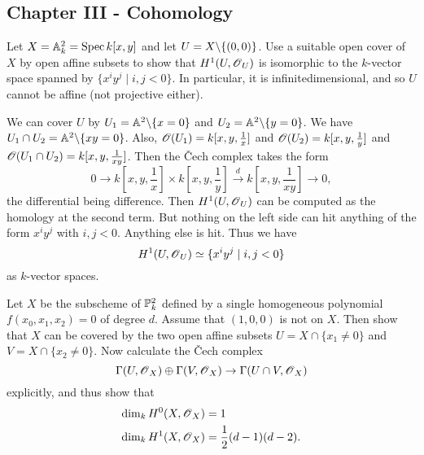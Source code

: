\documentclass[11pt, english]{article}
\begin{document}
\subsection{Chapter III - Cohomology}

\begin{exc}[Exercise 4.3]
Let $X= \mathbb{A}^2_k=\operatorname{Spec} k[x,y]$ and let $U = X \backslash \{(0,0)\}$. Use a suitable open cover of $X$ by open affine subsets to show that $H^1(U,\operatorname{\mathscr{O}}_U)$ is isomorphic to the $k$-vector space spanned by $\{ x^i y^j \mid i,j < 0 \}$. In particular, it is infinitedimensional, and so $U$ cannot be affine (not projective either).  
\end{exc}
\begin{sol}
We can cover $U$ by $U_1= \mathbb{A}^2 \backslash \{ x= 0\}$ and $U_2 = \mathbb{A}^2 \backslash \{ y = 0\}$. We have $U_1 \cap U_2 = \mathbb{A}^2 \backslash \{ xy=0\}$. Also, $\operatorname{\mathscr{O}}(U_1)=k[x,y,\frac 1x]$ and $\operatorname{\mathscr{O}}(U_2)=k[x,y,\frac 1y]$ and $\operatorname{\mathscr{O}}(U_1 \cap U_2) = k[x,y,\frac {1}{xy}]$. Then the \v{C}ech complex takes the form
\[
0 \to k[x,y,\frac 1x] \times k[x,y, \frac 1y] \xrightarrow{d} k[x,y,\frac{1}{xy}] \to 0,
\]
the differential being difference. Then $H^1(U,\operatorname{\mathscr{O}}_U)$ can be computed as the homology at the second term. But nothing on the left side can hit anything of the form $x^iy^j$ with $i,j < 0$. Anything else is hit. Thus we have
\[
H^1(U, \operatorname{\mathscr{O}}_U) \simeq \{ x^i y^j \mid i,j < 0 \}
\]
as $k$-vector spaces.
\end{sol}

\begin{exc}[Exercise 4.7]
Let $X$ be the subscheme of $\mathbb{P}_k^2$ defined by a single homogeneous polynomial $f(x_0,x_1,x_2)=0$ of degree $d$. Assume that $(1,0,0)$ is not on $X$. Then show that $X$ can be covered by the two open affine subsets $U= X \cap \{ x_1 \neq 0\}$ and $V = X \cap \{ x_2 \neq 0\}$. Now calculate the \v Cech complex
\[
\Gamma(U,\operatorname{\mathscr{O}}_X) \oplus \Gamma(V,\operatorname{\mathscr{O}}_X) \to \Gamma(U \cap V, \operatorname{\mathscr{O}}_X)
\]
explicitly, and thus show that
\begin{align*}
  \dim_k H^0(X,\operatorname{\mathscr{O}}_X) &= 1 \\
\dim _k H^1(X,\operatorname{\mathscr{O}}_X) &= \frac 12 (d-1)(d-2).
\end{align*}
\end{exc}
\end{document}
